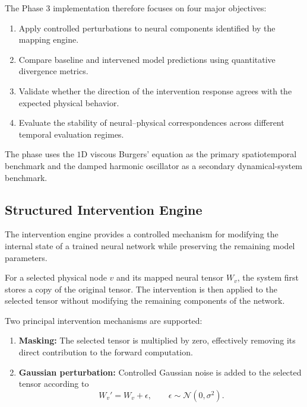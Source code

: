 \documentclass[12pt,singleside,a4paper]{article}
\begin{document}
The Phase 3 implementation therefore focuses on four major objectives:

\begin{enumerate}
    \item Apply controlled perturbations to neural components identified
    by the mapping engine.
    
    \item Compare baseline and intervened model predictions using
    quantitative divergence metrics.
    
    \item Validate whether the direction of the intervention response
    agrees with the expected physical behavior.
    
    \item Evaluate the stability of neural--physical correspondences
    across different temporal evaluation regimes.
\end{enumerate}

The phase uses the $1$D viscous Burgers' equation as the primary
spatiotemporal benchmark and the damped harmonic oscillator as a
secondary dynamical-system benchmark.


\subsection{Structured Intervention Engine}

The intervention engine provides a controlled mechanism for modifying
the internal state of a trained neural network while preserving the
remaining model parameters.

For a selected physical node $v$ and its mapped neural tensor
$W_v$, the system first stores a copy of the original tensor. The
intervention is then applied to the selected tensor without modifying
the remaining components of the network.

Two principal intervention mechanisms are supported:

\begin{enumerate}
    \item \textbf{Masking:} The selected tensor is multiplied by zero,
    effectively removing its direct contribution to the forward
    computation.
    
    \item \textbf{Gaussian perturbation:} Controlled Gaussian noise is
    added to the selected tensor according to
    \begin{equation}
        W_v' = W_v + \epsilon,
        \qquad
        \epsilon \sim \mathcal{N}(0,\sigma^2).
    \end{equation}
\end{enumerate}
\end{document}
